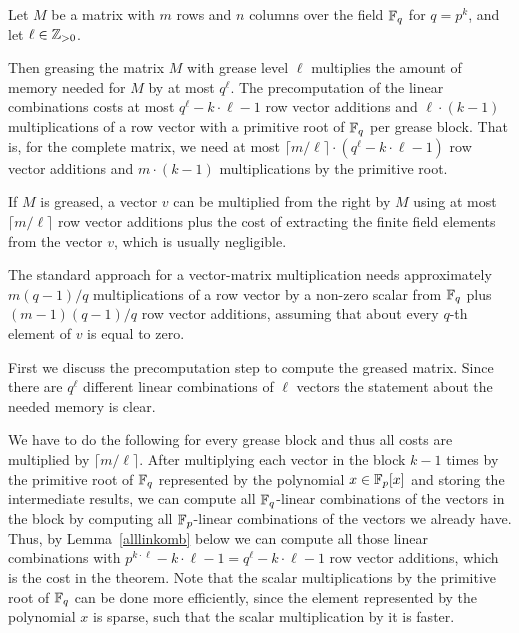 \begin{Theo}
\label{theogrease}
%
Let $M$ be a matrix with $m$ rows and $n$ columns over the field\/ $\mathbb{F}_q$
for $q = p^k$, and let $\ell \in \mathbb{Z}_{> 0}$.

\enlargethispage{-1\baselineskip}
Then greasing the matrix $M$ with grease level $\ell$ multiplies the amount
of memory needed for $M$ by at most $q^\ell$. The precomputation of the
linear combinations costs at most 
$q^\ell-k\cdot \ell -1$ row vector additions 
and $\ell \cdot (k-1)$ multiplications of a row vector with a primitive
root of\/ $\mathbb{F}_q$ per grease block. That is, for the complete matrix, we
need at most $\lceil m/\ell \rceil \cdot (q^\ell-k\cdot \ell -1)$ row
vector additions and $m \cdot (k-1)$ multiplications by the primitive
root.

If $M$ is greased, a vector $v$ can be multiplied from the right by $M$
using at most $\lceil m/\ell \rceil$ row vector additions plus the 
cost of extracting the finite field elements from the vector $v$, which
is usually negligible.

The standard approach for a vector-matrix multiplication needs 
approximately $m(q-1)/q$ multiplications of a row vector by a non-zero
scalar from\/ $\mathbb{F}_q$ plus $(m-1)(q-1)/q$ row vector additions, assuming that 
about every $q$-th element of $v$ is equal to zero.
\end{Theo}
\Proof First we discuss the precomputation step to compute the greased
matrix. Since there are $q^\ell$ different linear combinations of $\ell$ 
vectors the statement about the needed memory is clear.

We have to do the following for every grease block and thus 
all costs are multiplied by $\lceil m/\ell \rceil$. 
After multiplying each vector in the
block $k-1$ times by the primitive root of $\mathbb{F}_q$ represented by the
polynomial $x \in \mathbb{F}_p[x]$ and storing the intermediate results, 
we can compute all $\mathbb{F}_q$-linear combinations
of the vectors in the block by computing all $\mathbb{F}_p$-linear combinations
of the vectors we already have. Thus, by Lemma~\ref{alllinkomb} below we can
compute all those linear combinations with 
$p^{k\cdot \ell} - k\cdot \ell - 1 = 
q^\ell - k \cdot \ell - 1$ row vector additions, which is the cost in the
theorem. Note that the scalar multiplications by the
primitive root of\/ $\mathbb{F}_q$ can be done
more efficiently, since the element represented by the polynomial $x$
is sparse, such that the scalar multiplication by it is faster.

